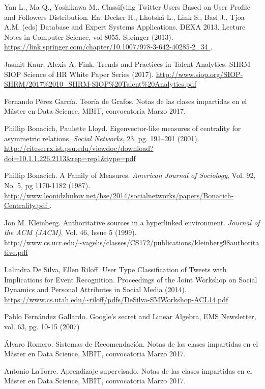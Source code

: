 \begin{thebibliography}{3}
 Yan L., Ma Q., Yoshikawa M.. Classifying Twitter Users Based on User Profile and Followers Distribution. En: Decker H., Lhotská L., Link S., Basl J., Tjoa A.M. (eds) Database and Expert Systems Applications. DEXA 2013. Lecture Notes in Computer Science, vol 8055. Springer (2013).
\url{https://link.springer.com/chapter/10.1007/978-3-642-40285-2_34 }.

 Jasmit Kaur, Alexis A. Fink. Trends and Practices in Talent
Analytics. SHRM-SIOP Science of HR White Paper Series (2017).
\url{http://www.siop.org/SIOP-SHRM/2017%2010_SHRM-SIOP%20Talent%20Analytics.pdf }

 Fernando Pérez García. Teoría de Grafos. Notas de las clases
impartidas en el Máster en Data Science, MBIT, convocatoria Marzo 2017.

 Phillip Bonacich, Paulette Lloyd. 
Eigenvector-like measures of centrality for asymmetric relations.
{\em Social Networks}, 23, pg. 191–201 (2001).
\url{http://citeseerx.ist.psu.edu/viewdoc/download?doi=10.1.1.226.2113&rep=rep1&type=pdf }

 Phillip Bonacich. A Family of Measures. {\em American Journal 
of Sociology}, Vol. 92, No. 5, pg 1170-1182 (1987). 
\url{http://www.leonidzhukov.net/hse/2014/socialnetworks/papers/Bonacich-Centrality.pdf }.

Jon M. Kleinberg. Authoritative sources in a hyperlinked environment.
{\em Journal of the ACM (JACM)}, Vol. 46, Issue 5 (1999).
\url{http://www.cs.ucr.edu/~vagelis/classes/CS172/publications/kleinberg98authoritative.pdf } 


 Lalindra De Silva, Ellen Riloff. User Type Classification of Tweets with Implications 
for Event Recognition. Proceedings of the Joint Workshop on Social Dynamics and Personal Attributes 
in Social Media (2014).
\url{https://www.cs.utah.edu/~riloff/pdfs/DeSilva-SMWorkshop-ACL14.pdf }

 Pablo Fernández Gallardo. Google’s secret and Linear Algebra,
 EMS Newsletter, vol. 63, pg. 10-15 (2007)

 Álvaro Romero. Sistemas de Recomendación. Notas de las clases
impartidas en el Máster en Data Science, MBIT, convocatoria Marzo 2017.

 Antonio LaTorre. Aprendizaje supervisado. Notas de las clases
impartidas en el Máster en Data Science, MBIT, convocatoria Marzo 2017.
\end{thebibliography}